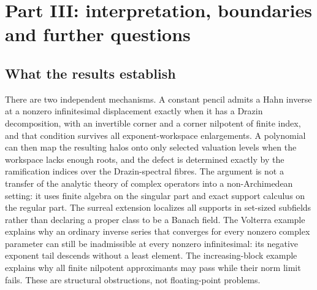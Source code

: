 \documentclass[11pt,a4paper]{article}
\numberwithin{equation}{section}
\theoremstyle{definition}
\theoremstyle{remark}
\begin{document}
\section{Part III: interpretation, boundaries and further questions}\label{ihs:dz:sec:limits}

\subsection{What the results establish}\label{ihs:dz:sec:establish}
There are two independent mechanisms. A constant pencil admits a Hahn
inverse at a nonzero infinitesimal displacement exactly when it has a Drazin
decomposition, with an invertible corner and a corner nilpotent of finite
index, and that condition survives all
exponent-workspace enlargements. A polynomial can then map the resulting
halos onto only selected valuation levels when the workspace lacks enough
roots, and the defect is determined exactly by the ramification indices over
the Drazin-spectral fibres. The argument is not a transfer of the analytic
theory of complex operators into a non-Archimedean setting: it uses finite
algebra on the singular part and exact support calculus on the regular part.
The surreal extension localizes all supports in set-sized subfields rather
than declaring a proper class to be a Banach field. The Volterra example
explains why an ordinary inverse series that converges for every nonzero
complex parameter can still be inadmissible at every nonzero infinitesimal:
its negative exponent tail descends without a least element. The
increasing-block example explains why all finite nilpotent approximants may
pass while their norm limit fails. These are structural obstructions, not
floating-point problems.
\end{document}
